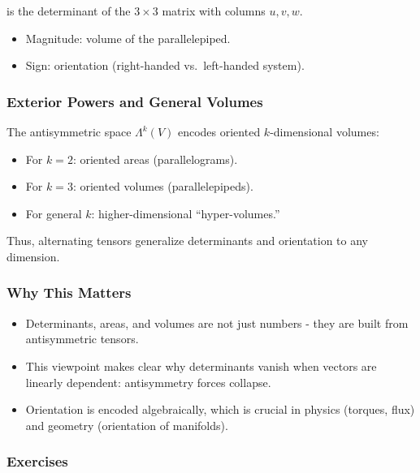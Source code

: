 \documentclass[
  letterpaper,
  DIV=11,
  numbers=noendperiod]{scrreprt}
\providecommand{\tightlist}{%
  \setlength{\itemsep}{0pt}\setlength{\parskip}{0pt}}
\begin{document}
is the determinant of the \(3 \times 3\) matrix with columns \(u,v,w\).

\begin{itemize}
\tightlist
\item
  Magnitude: volume of the parallelepiped.
\item
  Sign: orientation (right-handed vs.~left-handed system).
\end{itemize}

\subsubsection{Exterior Powers and General
Volumes}\label{exterior-powers-and-general-volumes}

The antisymmetric space \(\Lambda^k(V)\) encodes oriented
\(k\)-dimensional volumes:

\begin{itemize}
\tightlist
\item
  For \(k=2\): oriented areas (parallelograms).
\item
  For \(k=3\): oriented volumes (parallelepipeds).
\item
  For general \(k\): higher-dimensional ``hyper-volumes.''
\end{itemize}

Thus, alternating tensors generalize determinants and orientation to any
dimension.

\subsubsection{Why This Matters}\label{why-this-matters-15}

\begin{itemize}
\tightlist
\item
  Determinants, areas, and volumes are not just numbers - they are built
  from antisymmetric tensors.
\item
  This viewpoint makes clear why determinants vanish when vectors are
  linearly dependent: antisymmetry forces collapse.
\item
  Orientation is encoded algebraically, which is crucial in physics
  (torques, flux) and geometry (orientation of manifolds).
\end{itemize}

\subsubsection{Exercises}\label{exercises-27}
\end{document}
